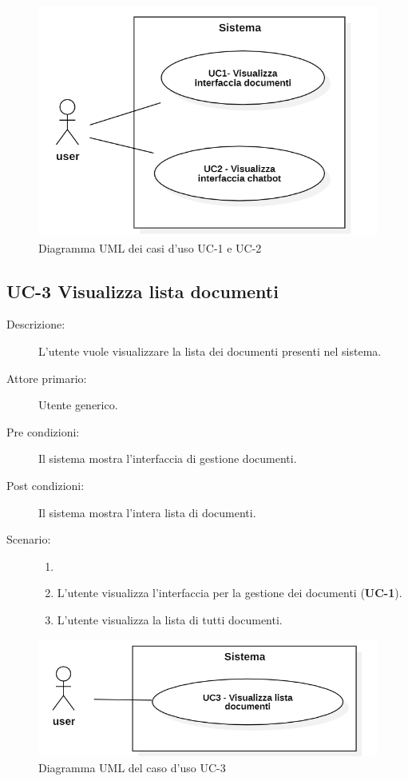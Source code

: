 \begin{figure}[H]
    \centering
    \includegraphics[width=0.66\linewidth]{UC1-2.PNG}
    \caption{Diagramma UML dei casi d'uso UC-1 e UC-2}
    \label{fig:UC1-2}
\end{figure}

\subsection{UC-3 Visualizza lista documenti}
\begin{description}
    \item[Descrizione:] L’utente vuole visualizzare la lista dei documenti presenti nel sistema.
    \item[Attore primario:] Utente generico.
    \item[Pre condizioni:] Il sistema mostra l’interfaccia di gestione documenti.
    \item[Post condizioni:] Il sistema mostra l’intera lista di documenti.
    \item[Scenario:] 
    \begin{enumerate}
        \item[] 
        \item L’utente visualizza l'interfaccia per la gestione dei documenti (\textbf{UC-1}).
        \item L’utente visualizza la lista di tutti documenti.
    \end{enumerate}
\end{description}

\begin{figure}[H]
    \centering
    \includegraphics[width=0.8\linewidth]{UC3.PNG}
    \caption{Diagramma UML del caso d'uso UC-3}
    \label{fig:UC3}
\end{figure}

